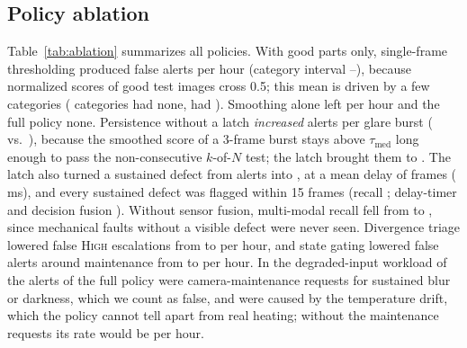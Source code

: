 \documentclass[conference]{IEEEtran}
\begin{document}
\subsection{Policy ablation}
Table~\ref{tab:ablation} summarizes all policies. With good parts only, single-frame thresholding produced \NominalFABaseline{} false alerts per hour (category interval \NominalFABaselineLo{}--\NominalFABaselineHi{}), because normalized scores of good test images cross 0.5; this mean is driven by a few categories (\NominalFABaselineZeroCats{} categories had none, \NominalFABaselineMaxCat{} had \NominalFABaselineMaxCatVal{}). Smoothing alone left \NominalFAEmaOnly{} per hour and the full policy none. Persistence without a latch \emph{increased} alerts per glare burst (\GlarePerBurstEmaKofn{} vs.\ \GlarePerBurstBaseline{}), because the smoothed score of a 3-frame burst stays above $\tau_{\text{med}}$ long enough to pass the non-consecutive $k$-of-$N$ test; the latch brought them to \GlarePerBurstFull{}. The latch also turned a sustained defect from \AlertsPerEpisodeBaseline{} alerts into \AlertsPerEpisodeFull{}, at a mean delay of \SustainedDelayFull{} frames (\SustainedDelayFullMs{}\,ms), and every sustained defect was flagged within 15 frames (recall \DefectRecallFull{}; delay-timer and decision fusion \DefectRecallTimer{}). Without sensor fusion, multi-modal recall fell from \MultiRecallFull{} to \MultiRecallNoFusion{}, since mechanical faults without a visible defect were never seen. Divergence triage lowered false \textsc{High} escalations from \CritFANoDiv{} to \CritFAFull{} per hour, and state gating lowered false alerts around maintenance from \StateFANoGating{} to \StateFAFull{} per hour. In the degraded-input workload \DegradedOpticalAlerts{} of the \DegradedAlertsTotal{} alerts of the full policy were camera-maintenance requests for sustained blur or darkness, which we count as false, and \DegradedSensorAlerts{} were caused by the temperature drift, which the policy cannot tell apart from real heating; without the maintenance requests its rate would be \DegradedFAFullNoMaint{} per hour.

\begin{table}[!t]
\centering
\caption{Paired differences, baseline minus \texttt{FULL\_POLICY}, per unit: mean [95\% category-cluster bootstrap interval] (number of categories in which \texttt{FULL\_POLICY} was better : worse, the remainder tied; exact sign-flip permutation $p$ over the 7 categories, smallest attainable \PermMinPMvtec{}). Positive values favor \texttt{FULL\_POLICY} except for recall, where negative values do.}
\label{tab:effects}
\scriptsize\setlength{\tabcolsep}{3pt}
\resizebox{\textwidth}{!}{}
\end{table}
\end{document}
